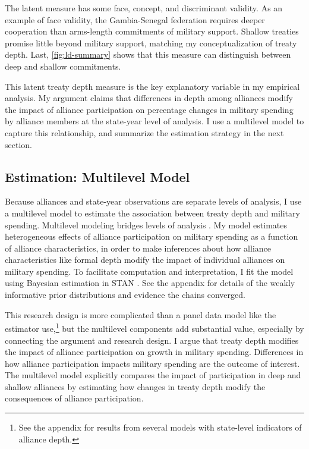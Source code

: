 \documentclass[12pt]{article}
\begin{document}
The latent measure has some face, concept, and discriminant validity. 
As an example of face validity, the Gambia-Senegal federation requires deeper cooperation than arms-length commitments of military support. 
Shallow treaties promise little beyond military support, matching my conceptualization of treaty depth. 
Last, \autoref{fig:ld-summary} shows that this measure can distinguish between deep and shallow commitments. 


This latent treaty depth measure is the key explanatory variable in my empirical analysis. 
My argument claims that differences in depth among alliances modify the impact of alliance participation on percentage changes in military spending by alliance members at the state-year level of analysis. 
I use a multilevel model to capture this relationship, and summarize the estimation strategy in the next section. 


\subsection{Estimation: Multilevel Model} 


Because alliances and state-year observations are separate levels of analysis, I use a multilevel model to estimate the association between treaty depth and military spending.  
Multilevel modeling bridges levels of analysis \citep{SteenbergenJones2002, GelmanHill2007}. 
My model estimates heterogeneous effects of alliance participation on military spending as a function of alliance characteristics, in order to make inferences about how alliance characteristics like formal depth modify the impact of individual alliances on military spending. 
To facilitate computation and interpretation, I fit the model using Bayesian estimation in STAN \citep{Carpenteretal2016}. 
See the appendix for details of the weakly informative prior distributions and evidence the chains converged.


This research design is more complicated than a panel data model like the estimator \citet{DigiuseppePoast2016} use,\footnote{See the appendix for results from several models with state-level indicators of alliance depth.} but the multilevel components add substantial value, especially by connecting the argument and research design.
I argue that treaty depth modifies the impact of alliance participation on growth in military spending. 
Differences in how alliance participation impacts military spending are the outcome of interest.  
The multilevel model explicitly compares the impact of participation in deep and shallow alliances by estimating how changes in treaty depth modify the consequences of alliance participation. 
\end{document}
